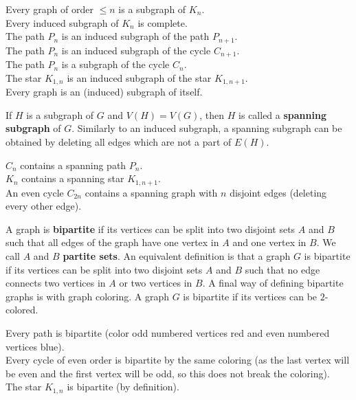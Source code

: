 \begin{example}
	Every graph of order $\le n$ is a subgraph of $K_{n}$.\\
	Every induced subgraph of $K_{n}$ is complete.\\
	The path $P_{n}$ is an induced subgraph of the path $P_{n+1}$.\\
	The path $P_{n}$ is an induced subgraph of the cycle $C_{n+1}$.\\
	The path $P_{n}$ is a subgraph of the cycle $C_{n}$.\\
	The star $K_{1,n}$ is an induced subgraph of the star $K_{1,n+1}$.\\
	Every graph is an (induced) subgraph of itself.\\
\end{example}
\begin{definition}
	If $H$ is a subgraph of $G$ and $V\left( H \right) = V\left( G \right) $, then $H$ is called a \textbf{spanning subgraph} of $G$. Similarly to an induced subgraph, a spanning subgraph can be obtained by deleting all edges which are not a part of $E\left( H \right) $.
\end{definition}
\begin{example}
	$C_{n}$ contains a spanning path $P_{n}$.\\
	$K_{n}$ contains a spanning star $K_{1,n+1}$.\\
	An even cycle $C_{2n}$ contains a spanning graph with $n$ disjoint edges (deleting every other edge).
\end{example}
\begin{definition}
	A graph is \textbf{bipartite} if its vertices can be split into two disjoint sets $A$ and $B$ such that all edges of the graph have one vertex in $A$ and one vertex in $B$. We call $A$ and $B$ \textbf{partite sets}. An equivalent definition is that a graph $G$ is bipartite if its vertices can be split into two disjoint sets $A$ and $B$ such that no edge connects two vertices in $A$ or two vertices in $B$. A final way of defining bipartite graphs is with graph coloring. A graph $G$ is bipartite if its vertices can be $2$-colored.
\end{definition}
\begin{example}
	Every path is bipartite (color odd numbered vertices red and even numbered vertices blue).\\
	Every cycle of even order is bipartite by the same coloring (as the last vertex will be even and the first vertex will be odd, so this does not break the coloring).\\
	The star $K_{1,n}$ is bipartite (by definition).
\end{example}
